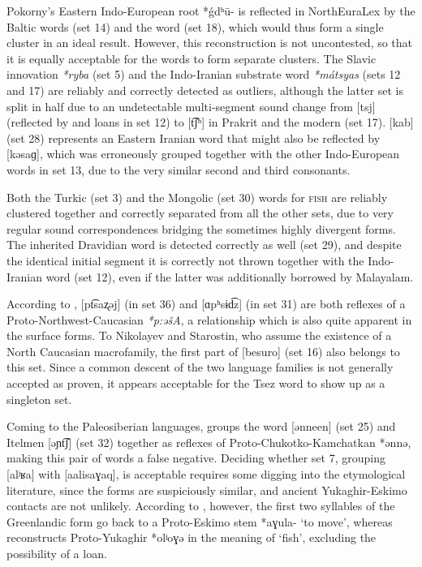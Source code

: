 Pokorny's Eastern Indo-European root *\'{g}dʰ\={u}- is reflected in NorthEuraLex by the Baltic words (set 14) and the  word (set 18), which would thus form a single cluster in an ideal result. However, this reconstruction is not uncontested, so that it is equally acceptable for the words to form separate clusters. The Slavic innovation \textit{*ryba} (set 5) and the Indo-Iranian substrate word \textit{*m\'{a}tsyas} (sets 12 and 17) are reliably and correctly detected as outliers, although the latter set is split in half due to an undetectable multi-segment sound change from  [tsj] (reflected by  and  loans in set 12) to [t͡ʃʰ] in Prakrit and the modern  (set 17).  [kab] (set 28) represents an Eastern Iranian word that might also be reflected by  [kəsaɡ], which was erroneously grouped together with the other Indo-European words in set 13, due to the very similar second and third consonants.

Both the Turkic (set 3) and the Mongolic (set 30) words for \textsc{fish} are reliably clustered together and correctly separated from all the other sets, due to very regular sound correspondences bridging the sometimes highly divergent forms. The inherited Dravidian word is detected correctly as well (set 29), and despite the identical initial segment it is correctly not thrown together with the Indo-Iranian word (set 12), even if the latter was additionally borrowed by Malayalam.

According to \cite{nikolayev_starostin_1994},  [pt͡saʐəj] (in set 36) and  [ɑpʰsɨd͡z] (in set 31) are both reflexes of a Proto-Northwest-Caucasian \textit{*p:ə\v{s}A}, a relationship which is also quite apparent in the surface forms. To Nikolayev and Starostin, who assume the existence of a North Caucasian macrofamily, the first part of  [besuro] (set 16) also belongs to this set. Since a common descent of the two language families is not generally accepted as proven, it appears acceptable for the Tsez word to show up as a singleton set.

Coming to the Paleosiberian languages, \cite{fortescue2005} groups the  word [ənneen] (set 25) and Itelmen [əɲt͡ʃ] (set 32)  together as reflexes of Proto-Chukotko-Kamchatkan *ənnə, making this pair of words a false negative. Deciding whether set 7, grouping  [alʲʁa] with  [aalisaɣaq], is acceptable requires some digging into the etymological literature, since the forms are suspiciously similar, and ancient Yukaghir-Eskimo contacts are not unlikely. According to \cite{fortescue_ea_2010}, however, the first two syllables of the Greenlandic form go back to a Proto-Eskimo stem *aɣula- `to move', whereas \citet[Lemma 1627]{nikolaeva2006} reconstructs Proto-Yukaghir *olʲoɣə in the meaning of `fish', excluding the possibility of a loan.

